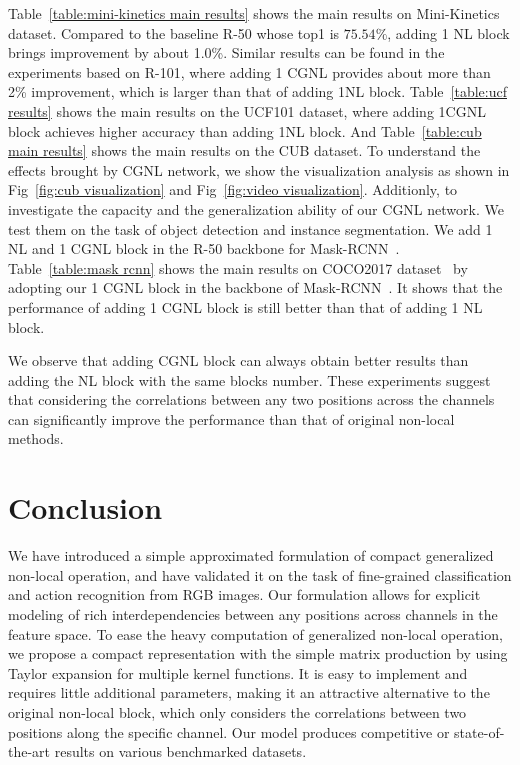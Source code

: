 \documentclass{article}
\begin{document}
Table~\ref{table:mini-kinetics main results} shows the main results on Mini-Kinetics dataset.
Compared to the baseline R-50 whose top1 is $75.54\%$, adding 1 NL block brings improvement by about 1.0\%.
Similar results can be found in the experiments based on R-101, where adding 1 CGNL provides about more than 2\% improvement, which is larger than that of adding 1NL block.
Table~\ref{table:ucf results} shows the main results on the UCF101 dataset, where adding 1CGNL block achieves higher accuracy than adding 1NL block.
And Table~\ref{table:cub main results} shows the main results on the CUB dataset.
To understand the effects brought by CGNL network, we show the visualization analysis as shown in Fig~\ref{fig:cub visualization} and Fig~\ref{fig:video visualization}.
Additionly, to investigate the capacity and the generalization ability of our CGNL network.
We test them on the task of object detection and instance segmentation.
We add 1 NL and 1 CGNL block in the R-50 backbone for Mask-RCNN~\cite{mask-rcnn}. Table~\ref{table:mask rcnn} shows the main results on COCO2017 dataset~\cite{coco2017} by adopting our 1 CGNL block in the backbone of Mask-RCNN~\cite{mask-rcnn}. It shows that the performance of adding 1 CGNL block is still better than that of adding 1 NL block.

We observe that adding CGNL block can always obtain better results than adding the NL block with the same blocks number.
These experiments suggest that considering the correlations between any two positions across the channels can significantly improve the performance than that of original non-local methods.
%
%
\section{Conclusion}
We have introduced a simple approximated formulation of compact generalized non-local operation, and have validated it on the task of fine-grained classification and action recognition from RGB images.
Our formulation allows for explicit modeling of rich interdependencies between any positions across channels in the feature space.
To ease the heavy computation of generalized non-local operation, we propose a compact representation with the simple matrix production by using Taylor expansion for multiple kernel functions.
It is easy to implement and requires little additional parameters, making it an attractive alternative to the original non-local block, which only considers the correlations between two positions along the specific channel.
Our model produces competitive or state-of-the-art results on various benchmarked datasets.
% 
% 
\end{document}
